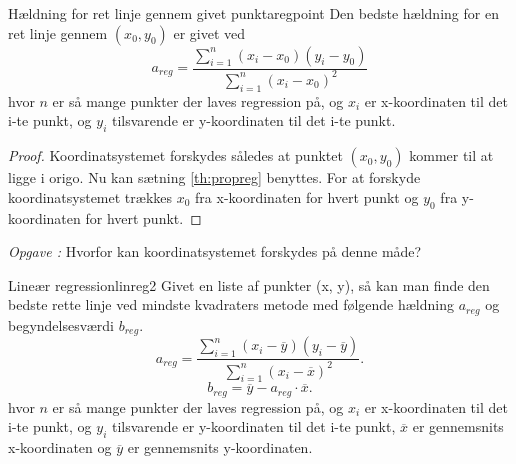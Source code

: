 \documentclass{article}
\newcounter{opgavecnt}
\newcommand{\opg}[1]{\stepcounter{opgavecnt}\textit{Opgave \arabic{opgavecnt}: }#1}
\begin{document}
\begin{theorem}{Hældning for ret linje gennem givet punkt}{aregpoint}
	Den bedste hældning for en ret linje gennem $(x_0, y_0)$ er givet ved
	\[
		a_{reg} = \frac{\sum_{i=1}^n (x_i-x_0)(y_i-y_0)}{\sum_{i=1}^n (x_i-x_0)^2}
	\] 
	hvor $n$ er så mange punkter der laves regression på, og $x_i$ er x-koordinaten
	til det i-te punkt, og $y_i$ tilsvarende er y-koordinaten til det i-te punkt.
\end{theorem}

\begin{proof}
Koordinatsystemet forskydes således at punktet $(x_0, y_0)$ kommer til at ligge
i origo. Nu kan sætning \ref{th:propreg} benyttes. For at forskyde
koordinatsystemet trækkes $x_0$ fra x-koordinaten for hvert punkt og $y_0$ fra
y-koordinaten for hvert punkt.
\end{proof}

\opg{Hvorfor kan koordinatsystemet forskydes på denne måde?}

\begin{theorem}{Lineær regression}{linreg2}
	Givet en liste af punkter (x, y), så kan man finde den bedste rette linje
	ved mindste kvadraters metode med følgende hældning $a_{reg}$ og
	begyndelsesværdi $b_{reg}$.
	\[
		a_{reg} = \frac{\sum_{i=1}^n (x_i-\overline{y})(y_i-\overline{y})}{\sum_{i=1}^n (x_i-\overline{x})^2}.
	\] 
	\[
		b_{reg} = \overline{y} - a_{reg} \cdot \overline{x}.
	\] 
	hvor $n$ er så mange punkter der laves regression på, og $x_i$ er x-koordinaten
	til det i-te punkt, og $y_i$ tilsvarende er y-koordinaten til det i-te punkt,
	$\overline{x}$ er gennemsnits x-koordinaten og $\overline{y}$ er
	gennemsnits y-koordinaten.
\end{theorem}
\end{document}
